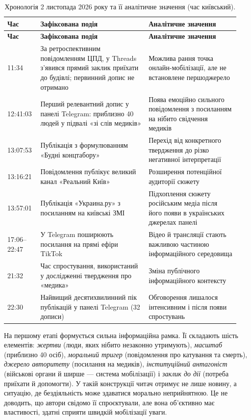 \begin{longtable}{@{}>{\raggedright\arraybackslash}p{0.13\linewidth}>{\raggedright\arraybackslash}p{0.44\linewidth}>{\raggedright\arraybackslash}p{0.37\linewidth}@{}}
\caption{Хронологія 2 листопада 2026 року та її аналітичне значення (час київський).}\label{tab:chron}\\
\toprule\textbf{Час} & \textbf{Зафіксована подія} & \textbf{Аналітичне значення}\\\midrule\endfirsthead
\toprule\textbf{Час} & \textbf{Зафіксована подія} & \textbf{Аналітичне значення}\\\midrule\endhead
\bottomrule\endfoot
\footnotesize 11:34 & \footnotesize За ретроспективним повідомленням ЦПД, у Threads з'явився прямий заклик приїхати до будівлі; первинний допис не отримано & \footnotesize Можлива рання точка онлайн-мобілізації, але не встановлене першоджерело\\
\footnotesize 12:41:03 & \footnotesize Перший релевантний допис у панелі Telegram: приблизно 40 людей у підвалі «зі слів медиків» & \footnotesize Поява емоційно сильного повідомлення з посиланням на нібито свідчення медиків\\
\footnotesize 13:07:53 & \footnotesize Публікація з формулюванням «Будні концтабору» & \footnotesize Перехід від конкретного твердження до різко негативної інтерпретації\\
\footnotesize 13:16:21 & \footnotesize Повідомлення публікує великий канал «Реальний Київ» & \footnotesize Розширення потенційної аудиторії сюжету\\
\footnotesize 13:57:01 & \footnotesize Публікація «Украина.ру» з посиланням на київські ЗМІ & \footnotesize Підхоплення сюжету російським медіа після його появи в українських джерелах панелі\\
\footnotesize 17:06--22:47 & \footnotesize У Telegram поширюють посилання на прямі ефіри TikTok & \footnotesize Відео й трансляції стають важливою частиною інформаційного середовища\\
\footnotesize 21:32 & \footnotesize Час спростування, використаний у дослідженні твердження про «медика» & \footnotesize Зміна публічного інформаційного контексту\\
\footnotesize 22:30 & \footnotesize Найвищий десятихвилинний пік публікацій у панелі Telegram (32 дописи) & \footnotesize Обговорення лишалося інтенсивним і після появи спростувань\\
\end{longtable}

На першому етапі формується сильна інформаційна рамка. Її складають шість елементів: \emph{жертви} (люди, яких нібито незаконно утримують), \emph{масштаб} (приблизно 40 осіб), \emph{моральний тригер} (повідомлення про катування та смерть), \emph{джерело авторитету} (посилання на медиків), \emph{інституційний антагоніст} (військові органи й ширше --- система мобілізації) і \emph{заклик до дії} (потреба приїхати й допомогти). У такій конструкції читач отримує не лише новину, а ситуацію, де бездіяльність може здаватися морально неприйнятною. Це не доводить, що автори свідомо її спроєктували, але вона об'єктивно має властивості, здатні сприяти швидкій мобілізації уваги.

